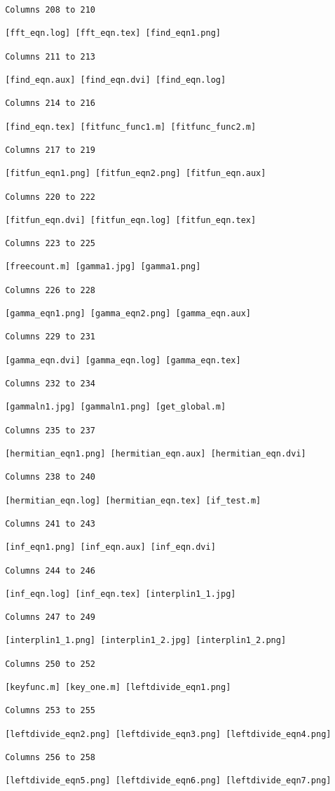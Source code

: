 \begin{verbatim}
 Columns 208 to 210

 [fft_eqn.log] [fft_eqn.tex] [find_eqn1.png] 

 Columns 211 to 213

 [find_eqn.aux] [find_eqn.dvi] [find_eqn.log] 

 Columns 214 to 216

 [find_eqn.tex] [fitfunc_func1.m] [fitfunc_func2.m] 

 Columns 217 to 219

 [fitfun_eqn1.png] [fitfun_eqn2.png] [fitfun_eqn.aux] 

 Columns 220 to 222

 [fitfun_eqn.dvi] [fitfun_eqn.log] [fitfun_eqn.tex] 

 Columns 223 to 225

 [freecount.m] [gamma1.jpg] [gamma1.png] 

 Columns 226 to 228

 [gamma_eqn1.png] [gamma_eqn2.png] [gamma_eqn.aux] 

 Columns 229 to 231

 [gamma_eqn.dvi] [gamma_eqn.log] [gamma_eqn.tex] 

 Columns 232 to 234

 [gammaln1.jpg] [gammaln1.png] [get_global.m] 

 Columns 235 to 237

 [hermitian_eqn1.png] [hermitian_eqn.aux] [hermitian_eqn.dvi] 

 Columns 238 to 240

 [hermitian_eqn.log] [hermitian_eqn.tex] [if_test.m] 

 Columns 241 to 243

 [inf_eqn1.png] [inf_eqn.aux] [inf_eqn.dvi] 

 Columns 244 to 246

 [inf_eqn.log] [inf_eqn.tex] [interplin1_1.jpg] 

 Columns 247 to 249

 [interplin1_1.png] [interplin1_2.jpg] [interplin1_2.png] 

 Columns 250 to 252

 [keyfunc.m] [key_one.m] [leftdivide_eqn1.png] 

 Columns 253 to 255

 [leftdivide_eqn2.png] [leftdivide_eqn3.png] [leftdivide_eqn4.png] 

 Columns 256 to 258

 [leftdivide_eqn5.png] [leftdivide_eqn6.png] [leftdivide_eqn7.png] 


\end{verbatim}
